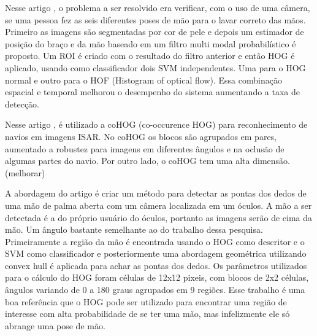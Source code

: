Nesse artigo \cite{llorca2011vision}, o problema a ser resolvido era verificar, com o uso de uma câmera, se uma pessoa  fez as seis diferentes poses de mão para o lavar correto das mãos. Primeiro as imagens são segmentadas por cor de pele e depois um estimador de posição do braço e da mão baseado em um filtro multi modal probabilístico é proposto. Um ROI é criado com o resultado do filtro anterior e então HOG é aplicado, usando como classificador dois SVM independentes. Uma para o HOG normal e outro para o HOF (Histogram of optical flow). Essa combinação espacial e temporal melhorou o desempenho do sistema aumentando a taxa de detecção.

Nesse artigo \cite{kawahara2012automatic}, é utilizado a coHOG (co-occurence HOG) para reconhecimento de navios em imagens ISAR. No coHOG os blocos são agrupados em pares, aumentado a robustez para imagens em diferentes ângulos e na oclusão de algumas partes do navio. Por outro lado, o coHOG tem uma alta dimensão. (melhorar)


A abordagem do artigo \cite{jiang2012robust} é criar um método para detectar as pontas dos dedos de uma mão de palma aberta com um câmera localizada em um óculos. A mão a ser detectada é a do próprio usuário do óculos, portanto as imagens serão de cima da mão. Um ângulo bastante semelhante ao do trabalho dessa pesquisa. Primeiramente a região da mão é encontrada usando o HOG como descritor e o SVM como classificador e posteriormente uma abordagem geométrica utilizando convex hull é aplicada para achar as pontas dos dedos. Os parâmetros utilizados para o cálculo do HOG foram células de 12x12 pixeis, com blocos de 2x2 células, ângulos variando de 0 a 180 graus agrupados em 9 regiões. Esse trabalho é uma boa referência que o HOG pode ser utilizado para encontrar uma região de interesse com alta probabilidade de se ter uma mão, mas infelizmente ele só abrange uma pose de mão.

